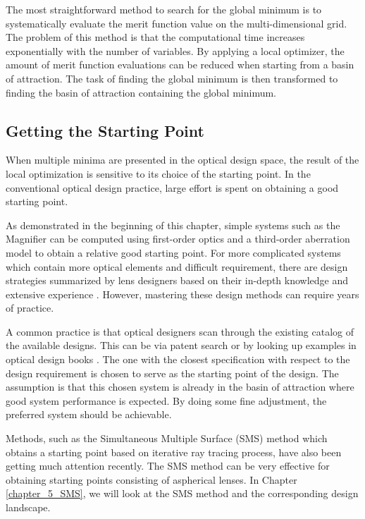The most straightforward method to search for the global minimum is to systematically evaluate the merit function value on the multi-dimensional grid. The problem of this method is that the computational time increases exponentially with the number of variables. By applying a local optimizer, the amount of merit function evaluations can be reduced when starting from a basin of attraction. The task of finding the global minimum is then transformed to finding the basin of attraction containing the global minimum. 

\subsection{Getting the Starting Point}
When multiple minima are presented in the optical design space, the result of the local optimization is sensitive to its choice of the starting point. In the conventional optical design practice, large effort is spent on obtaining a good starting point. 

As demonstrated in the beginning of this chapter, simple systems such as the Magnifier can be computed using first-order optics and a third-order aberration model to obtain a relative good starting point. For more complicated systems which contain more optical elements and difficult requirement, there are design strategies summarized by lens designers based on their in-depth knowledge and extensive experience \cite{LivshitsQA2013}\cite{Shafer1995_moreless}. However, mastering these design methods can require years of practice.   

A common practice is that optical designers scan through the existing catalog of the available designs. This can be via patent search or by looking up examples in optical design books \cite{smith1992modern} \cite{book:SmithModernOpticalEngineering}.  The one with the closest specification with respect to the design requirement is chosen to serve as the  starting point of the design. The assumption is that this chosen system is already in the basin of attraction where good system performance is expected. By doing some fine adjustment, the preferred system should be achievable. 

Methods, such as the Simultaneous Multiple Surface (SMS) method \cite{MinanoOE09} which obtains a starting point based on iterative ray tracing process, have also been getting much attention recently. The SMS method can be very effective for obtaining starting points consisting of aspherical lenses. In Chapter \ref{chapter_5_SMS}, we will look at the SMS method and the corresponding design landscape. 

